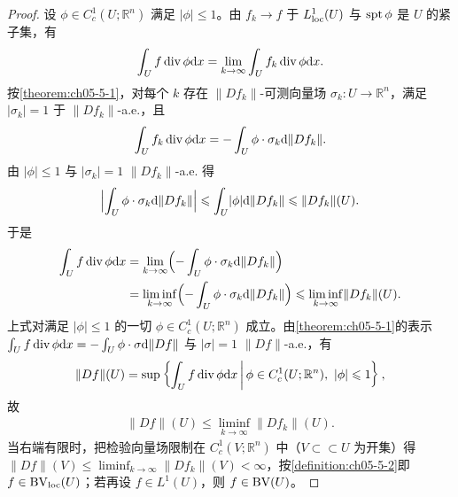 \documentclass[../../main.tex]{subfiles}%
\begin{document}
\begin{proof}
设 $\phi\in C_c^1(U;\mathbb{R}^n)$ 满足 $\lvert\phi\rvert\leqslant1$。由 $f_k\to f$ 于 $L^1_{\mathrm{loc}}(U)$ 与 $\operatorname{spt}\phi$ 是 $U$ 的紧子集，有
\begin{align*}
\int_U f\operatorname{div}\phi\mathrm{d} x=\lim_{k\to\infty}\int_U f_k\operatorname{div}\phi\mathrm{d} x .
\end{align*}
按\cref{theorem:ch05-5-1}，对每个 $k$ 存在 $\lVert Df_k\rVert$-可测向量场 $\sigma_k:U\to\mathbb{R}^n$，满足 $\lvert\sigma_k\rvert=1$ 于 $\lVert Df_k\rVert$-a.e.，且%
\begin{align*}
\int_U f_k\operatorname{div}\phi\mathrm{d} x=-\int_U\phi\cdot\sigma_k\mathrm{d}\lVert Df_k\rVert .
\end{align*}
由 $\lvert\phi\rvert\leqslant1$ 与 $\lvert\sigma_k\rvert=1$ $\lVert Df_k\rVert$-a.e. 得
\begin{align*}
\Bigl\lvert\int_U\phi\cdot\sigma_k\mathrm{d}\lVert Df_k\rVert\Bigr\rvert\leqslant\int_U\lvert\phi\rvert\mathrm{d}\lVert Df_k\rVert\leqslant\lVert Df_k\rVert(U).
\end{align*}
于是
\begin{align*}
\int_U f\operatorname{div}\phi\mathrm{d} x&=\lim_{k\to\infty}\Bigl(-\int_U\phi\cdot\sigma_k\mathrm{d}\lVert Df_k\rVert\Bigr)\\
&=\liminf_{k\to\infty}\Bigl(-\int_U\phi\cdot\sigma_k\mathrm{d}\lVert Df_k\rVert\Bigr)
\leqslant\liminf_{k\to\infty}\lVert Df_k\rVert(U).
\end{align*}
上式对满足 $\lvert\phi\rvert\leqslant1$ 的一切 $\phi\in C_c^1(U;\mathbb{R}^n)$ 成立。由\cref{theorem:ch05-5-1}的表示 $\int_U f\operatorname{div}\phi\mathrm{d} x=-\int_U\phi\cdot\sigma\mathrm{d}\lVert Df\rVert$ 与 $\lvert\sigma\rvert=1$ $\lVert Df\rVert$-a.e.，有%
\begin{align*}
\lVert Df\rVert(U)=\sup\left\{\int_U f\diver\phi\diff x\,\middle|\,\phi\in C_c^1(U;\mathbb{R}^n),\ \lvert\phi\rvert\leqslant1\right\},
\end{align*}
故
\begin{align*}
\lVert Df\rVert(U)\leqslant\liminf_{k\to\infty}\lVert Df_k\rVert(U).
\end{align*}
当右端有限时，把检验向量场限制在 $C_c^1(V;\mathbb{R}^n)$ 中（$V\subset\subset U$ 为开集）得 $\lVert Df\rVert(V)\leqslant\liminf_{k\to\infty}\lVert Df_k\rVert(V)<\infty$，按\cref{definition:ch05-5-2}即 $f\in\mathrm{BV}_{\mathrm{loc}}(U)$；若再设 $f\in L^1(U)$，则 $f\in\mathrm{BV}(U)$。%
\end{proof}
\end{document}
